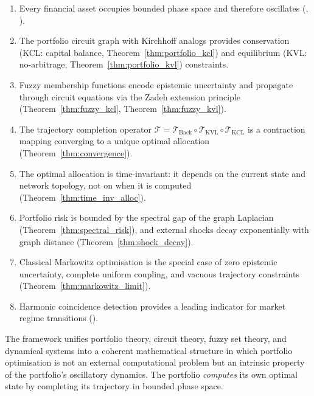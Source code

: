 \documentclass[twocolumn,10pt]{article}
\theoremstyle{remark}
\newcommand{\Tkcl}{\mathcal{T}_{\mathrm{KCL}}}
\newcommand{\Tkvl}{\mathcal{T}_{\mathrm{KVL}}}
\newcommand{\Tback}{\mathcal{T}_{\mathrm{Back}}}
\newcommand{\Tcomp}{\mathcal{T}}
\newcommand{\thmref}[1]{Theorem~\ref{#1}}
\begin{document}
\begin{enumerate}[label=\arabic*.]
    \item Every financial asset occupies bounded phase space and therefore oscillates (, ).

    \item The portfolio circuit graph with Kirchhoff analogs provides conservation (KCL: capital balance, \thmref{thm:portfolio_kcl}) and equilibrium (KVL: no-arbitrage, \thmref{thm:portfolio_kvl}) constraints.

    \item Fuzzy membership functions encode epistemic uncertainty and propagate through circuit equations via the Zadeh extension principle (\thmref{thm:fuzzy_kcl}, \thmref{thm:fuzzy_kvl}).

    \item The trajectory completion operator $\Tcomp = \Tback \circ \Tkvl \circ \Tkcl$ is a contraction mapping converging to a unique optimal allocation (\thmref{thm:convergence}).

    \item The optimal allocation is time-invariant: it depends on the current state and network topology, not on when it is computed (\thmref{thm:time_inv_alloc}).

    \item Portfolio risk is bounded by the spectral gap of the graph Laplacian (\thmref{thm:spectral_risk}), and external shocks decay exponentially with graph distance (\thmref{thm:shock_decay}).

    \item Classical Markowitz optimisation is the special case of zero epistemic uncertainty, complete uniform coupling, and vacuous trajectory constraints (\thmref{thm:markowitz_limit}).

    \item Harmonic coincidence detection provides a leading indicator for market regime transitions ().
\end{enumerate}

The framework unifies portfolio theory, circuit theory, fuzzy set theory, and dynamical systems into a coherent mathematical structure in which portfolio optimisation is not an external computational problem but an intrinsic property of the portfolio's oscillatory dynamics.  The portfolio \emph{computes} its own optimal state by completing its trajectory in bounded phase space.



\end{document}
